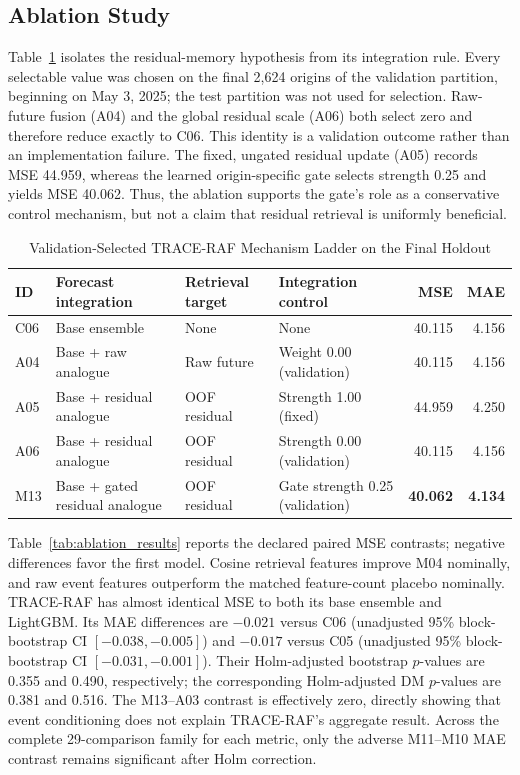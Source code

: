 \documentclass{ieeeaccess}
\begin{document}
\subsection{Ablation Study}
Table~\ref{tab:trace_mechanism} isolates the residual-memory hypothesis from
its integration rule. Every selectable value was chosen on the final 2,624
origins of the validation partition, beginning on May 3, 2025; the test
partition was not used for selection. Raw-future fusion (A04) and the global
residual scale (A06) both select zero and therefore reduce exactly to C06. This
identity is a validation outcome rather than an implementation failure. The
fixed, ungated residual update (A05) records MSE 44.959, whereas the learned
origin-specific gate selects strength 0.25 and yields MSE 40.062. Thus, the
ablation supports the gate's role as a conservative control mechanism, but not
a claim that residual retrieval is uniformly beneficial.

\begin{table}[!t]
\centering
\caption{Validation-Selected TRACE-RAF Mechanism Ladder on the Final Holdout}
\label{tab:trace_mechanism}
\begin{tabular}{llllrr}
\toprule
ID & Forecast integration & Retrieval target & Integration control & MSE & MAE \\
\midrule
C06 & Base ensemble & None & None & 40.115 & 4.156 \\
A04 & Base + raw analogue & Raw future & Weight 0.00 (validation) & 40.115 & 4.156 \\
A05 & Base + residual analogue & OOF residual & Strength 1.00 (fixed) & 44.959 & 4.250 \\
A06 & Base + residual analogue & OOF residual & Strength 0.00 (validation) & 40.115 & 4.156 \\
M13 & Base + gated residual analogue & OOF residual & Gate strength 0.25 (validation) & \textbf{40.062} & \textbf{4.134} \\
\bottomrule
\end{tabular}
\end{table}

Table~\ref{tab:ablation_results} reports the declared paired MSE contrasts;
negative differences favor the first model. Cosine retrieval features improve
M04 nominally, and raw event features outperform the matched feature-count
placebo nominally. TRACE-RAF has almost identical MSE to both its base ensemble
and LightGBM. Its MAE differences are $-0.021$ versus C06 (unadjusted 95\%
block-bootstrap CI $[-0.038,-0.005]$) and $-0.017$ versus C05 (unadjusted 95\%
block-bootstrap CI $[-0.031,-0.001]$). Their Holm-adjusted bootstrap $p$-values
are 0.355 and 0.490, respectively; the corresponding Holm-adjusted DM
$p$-values are 0.381 and 0.516. The M13--A03 contrast is effectively zero,
directly showing that event conditioning does not explain TRACE-RAF's aggregate
result. Across the complete 29-comparison family for each metric, only the
adverse M11--M10 MAE contrast remains significant after Holm correction.
\end{document}

